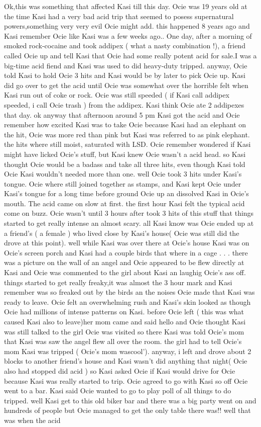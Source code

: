 \documentclass[12pt]{book}
\begin{document}
Ok,this was something that affected Kasi till this day. Ocie was 19 years old at the time Kasi had a very bad acid trip that seemed to posess supernatural powers,something very very evil Ocie might add. this happened 8 years ago and Kasi remember Ocie like Kasi was a few weeks ago.. One day, after a morning of smoked rock-cocaine and took addipex ( what a nasty combination !), a friend called Ocie up and tell Kasi that Ocie had some really potent acid for sale.I was a big-time acid fiend and Kasi was used to did heavy-duty tripped. anyway, Ocie told Kasi to hold Ocie 3 hits and Kasi would be by later to pick Ocie up. Kasi did go over to get the acid until Ocie was somewhat over the horrible felt when Kasi run out of coke or rock. Ocie was still speeded ( if Kasi call addipex speeded, i call Ocie trash ) from the addipex. Kasi think Ocie ate 2 addipexes that day. ok anyway that afternoon around 5 pm Kasi got the acid and Ocie remember how excited Kasi was to take Ocie because Kasi had an elephant on the hit, Ocie was more red than pink but Kasi was referred to as pink elephant. the hits where still moist, saturated with LSD. Ocie remember wondered if Kasi might have licked Ocie's stuff, but Kasi knew Ocie wasn't a acid head. so Kasi thought Ocie would be a badass and take all three hits, even though Kasi told Ocie Kasi wouldn't needed more than one. well Ocie took 3 hits under Kasi's tongue. Ocie where still joined together as stamps, and Kasi kept Ocie under Kasi's tongue for a long time before ground Ocie up an dissolved Kasi in Ocie's mouth. The acid came on slow at first. the first hour Kasi felt the typical acid come on buzz. Ocie wasn't until 3 hours after took 3 hits of this stuff that things started to get really intense an almost scary. all Kasi know was Ocie ended up at a friend's (  a female ) who lived close by Kasi's house( Ocie was still did the drove at this point). well while Kasi was over there at Ocie's house Kasi was on Ocie's screen porch and Kasi had a couple birds that where in a cage . . .  there was a picture on the wall of an angel and Ocie appeared to be flew directly at Kasi and Ocie was commented to the girl about Kasi an laughig Ocie's ass off. things started to get really freaky,it was almost the 3 hour mark and Kasi remember was so freaked out by the birds an the noises Ocie made that Kasi was ready to leave. Ocie felt an overwhelming rush and Kasi's skin looked as though Ocie had millions of intense patterns on Kasi. before Ocie left ( this was what caused Kasi also to leave)her mom came and said hello and Ocie thought Kasi was still talked to the girl Ocie was visited so there Kasi was told Ocie's mom that Kasi was saw the angel flew all over the room. the girl had to tell Ocie's mom Kasi was tripped ( Ocie's mom wascool'). anyway, i left and drove about 2 blocks to another friend's house and Kasi wasn't did anything that night( Ocie also had stopped did acid ) so Kasi asked Ocie if Kasi would drive for Ocie because Kasi was really started to trip. Ocie agreed to go with Kasi so off Ocie went to a bar. Kasi said Ocie wanted to go to play poll of all things to do tripped. well Kasi get to this old biker bar and there was a big party went on and hundreds of people but Ocie managed to get the only table there was!! well that was when the acid 
\end{document}
